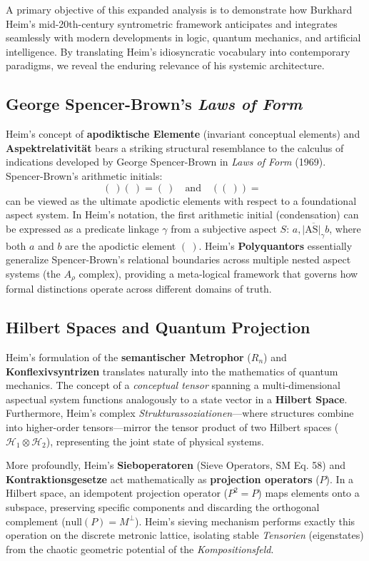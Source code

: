 \documentclass[12pt]{article}
\begin{document}
A primary objective of this expanded analysis is to demonstrate how Burkhard Heim's mid-20th-century syntrometric framework anticipates and integrates seamlessly with modern developments in logic, quantum mechanics, and artificial intelligence. By translating Heim's idiosyncratic vocabulary into contemporary paradigms, we reveal the enduring relevance of his systemic architecture.

\subsection{George Spencer-Brown’s \textit{Laws of Form}}
Heim's concept of \textbf{apodiktische Elemente} (invariant conceptual elements) and \textbf{Aspektrelativität} bears a striking structural resemblance to the calculus of indications developed by George Spencer-Brown in \textit{Laws of Form} (1969). Spencer-Brown's arithmetic initials:
\begin{equation*}
(\ ) (\ ) = (\ ) \quad \text{and} \quad ((\ )) = \text{ }
\end{equation*}
can be viewed as the ultimate apodictic elements with respect to a foundational aspect system. In Heim's notation, the first arithmetic initial (condensation) can be expressed as a predicate linkage $\gamma$ from a subjective aspect $S$: $a, \overline{|\mathrm{AS}|_\gamma} b$, where both $a$ and $b$ are the apodictic element $(\ )$. Heim's \textbf{Polyquantors} essentially generalize Spencer-Brown's relational boundaries across multiple nested aspect systems (the $A_\rho$ complex), providing a meta-logical framework that governs how formal distinctions operate across different domains of truth.

\subsection{Hilbert Spaces and Quantum Projection}
Heim's formulation of the \textbf{semantischer Metrophor} ($R_n$) and \textbf{Konflexivsyntrizen} translates naturally into the mathematics of quantum mechanics. The concept of a \textit{conceptual tensor} spanning a multi-dimensional aspectual system functions analogously to a state vector in a \textbf{Hilbert Space}. Furthermore, Heim's complex \textit{Strukturassoziationen}—where structures combine into higher-order tensors—mirror the tensor product of two Hilbert spaces ($\mathcal{H}_1 \otimes \mathcal{H}_2$), representing the joint state of physical systems.

More profoundly, Heim's \textbf{Sieboperatoren} (Sieve Operators, SM Eq. 58) and \textbf{Kontraktionsgesetze} act mathematically as \textbf{projection operators} ($P$). In a Hilbert space, an idempotent projection operator ($P^2 = P$) maps elements onto a subspace, preserving specific components and discarding the orthogonal complement ($\text{null}(P) = M^\perp$). Heim's sieving mechanism performs exactly this operation on the discrete metronic lattice, isolating stable \textit{Tensorien} (eigenstates) from the chaotic geometric potential of the \textit{Kompositionsfeld}.
\end{document}
